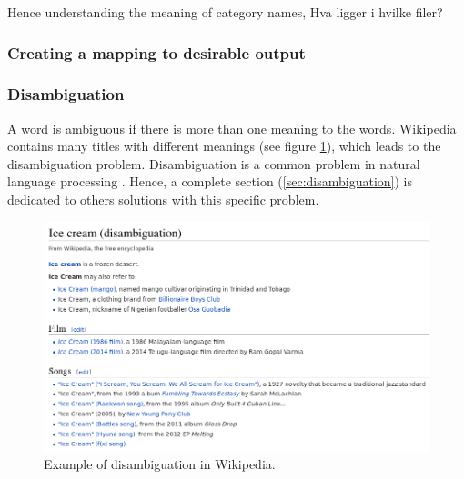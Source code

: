 Hence understanding the meaning of category names, 
Hva ligger i hvilke filer?

\subsubsection{Creating a mapping to desirable output}


\subsubsection{Disambiguation}
A word is ambiguous if there is more than one meaning to the words. Wikipedia contains many titles with different meanings (see figure \ref{fig:disambiguation_example}), which leads to the disambiguation problem. Disambiguation is a common problem in natural language processing \cite{wiki:disambiguation}. Hence, a complete section (\ref{sec:disambiguation}) is dedicated to others solutions with this specific problem. 

\begin{figure}[h]
\centering
\includegraphics[width=\textwidth]{Chapters/Introduction/Ice_cream_disambiguation}
\caption{Example of disambiguation in Wikipedia.}
\label{fig:disambiguation_example}
\end{figure}